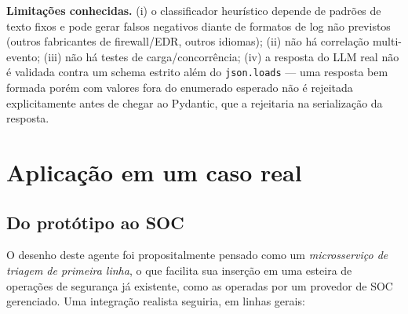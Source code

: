 \documentclass[11pt,a4paper]{article}
\begin{document}
\textbf{Limitações conhecidas.} (i) o classificador heurístico depende de padrões de
texto fixos e pode gerar falsos negativos diante de formatos de log não previstos
(outros fabricantes de firewall/EDR, outros idiomas); (ii) não há correlação
multi-evento; (iii) não há testes de carga/concorrência; (iv) a resposta do LLM real
não é validada contra um schema estrito além do \texttt{json.loads} --- uma resposta
bem formada porém com valores fora do enumerado esperado não é rejeitada explicitamente
antes de chegar ao Pydantic, que a rejeitaria na serialização da resposta.

\section{Aplicação em um caso real}
\label{sec:caso-real}

\subsection{Do protótipo ao SOC}

O desenho deste agente foi propositalmente pensado como um \emph{microsserviço de
triagem de primeira linha}, o que facilita sua inserção em uma esteira de operações de
segurança já existente, como as operadas por um provedor de SOC gerenciado. Uma
integração realista seguiria, em linhas gerais:
\end{document}
